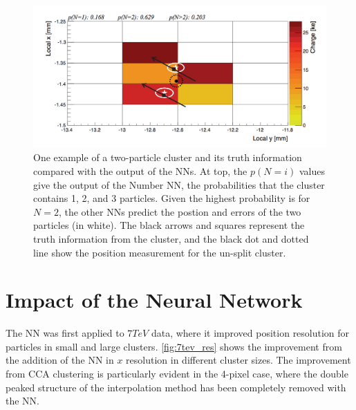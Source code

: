 \begin{centering}
\begin{figure}[bth]
\myfloatalign
\includegraphics[width=.90\linewidth]{figures/nn/merged_cluster.png}
\caption{One example of a two-particle cluster and its truth information compared with the output of the \acp{NN}. At top, the $p(N=i)$ values give the output of the Number \ac{NN}, the probabilities that the cluster contains 1, 2, and 3 particles. Given the highest probability is for $N=2$, the other \acp{NN} predict the postion and errors of the two particles (in white). The black arrows and squares represent the truth information from the cluster, and the black dot and dotted line show the position measurement for the un-split cluster.}
\label{fig:merged_cluster}
\end{figure}
\end{centering}

\section{Impact of the Neural Network}

The \ac{NN} was first applied to $7 TeV$ data, where it improved position resolution for particles in small and large clusters. \autoref{fig:7tev_res} shows the improvement from the addition of the \ac{NN} in $x$ resolution in different cluster sizes. The improvement from \ac{CCA} clustering is particularly evident in the 4-pixel case, where the double peaked structure of the interpolation method has been completely removed with the \ac{NN}.  

